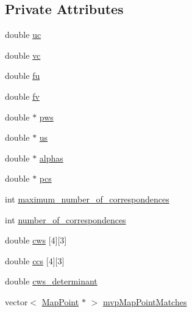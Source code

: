 \subsection*{Private Attributes}
\begin{DoxyCompactItemize}
\item 
double \mbox{\hyperlink{class_o_r_b___s_l_a_m2_1_1_pn_psolver_aed7cb3c5dcf35bb2e6074679ba2a76e3}{uc}}
\item 
double \mbox{\hyperlink{class_o_r_b___s_l_a_m2_1_1_pn_psolver_a8c88482e4f7fb0ca8519a4897c936f4f}{vc}}
\item 
double \mbox{\hyperlink{class_o_r_b___s_l_a_m2_1_1_pn_psolver_af65e2f3506f97dd52f00be073209acd1}{fu}}
\item 
double \mbox{\hyperlink{class_o_r_b___s_l_a_m2_1_1_pn_psolver_a97e47e678a18e47e29a3d9b6842222eb}{fv}}
\item 
double $\ast$ \mbox{\hyperlink{class_o_r_b___s_l_a_m2_1_1_pn_psolver_a053e3eea03b62181aa944c9fc20d5bfa}{pws}}
\item 
double $\ast$ \mbox{\hyperlink{class_o_r_b___s_l_a_m2_1_1_pn_psolver_afc95fe222dcfad864207925e2783e9ce}{us}}
\item 
double $\ast$ \mbox{\hyperlink{class_o_r_b___s_l_a_m2_1_1_pn_psolver_a868ef3e00710a5541d50a15af7be2a20}{alphas}}
\item 
double $\ast$ \mbox{\hyperlink{class_o_r_b___s_l_a_m2_1_1_pn_psolver_ac832e2ede20f3a111a29b4d1c24b0587}{pcs}}
\item 
int \mbox{\hyperlink{class_o_r_b___s_l_a_m2_1_1_pn_psolver_a7c44ad1754b7d0817470a96156d5772a}{maximum\+\_\+number\+\_\+of\+\_\+correspondences}}
\item 
int \mbox{\hyperlink{class_o_r_b___s_l_a_m2_1_1_pn_psolver_a2e762455c896cbc55bd81c77af87941f}{number\+\_\+of\+\_\+correspondences}}
\item 
double \mbox{\hyperlink{class_o_r_b___s_l_a_m2_1_1_pn_psolver_acce97bf95ac136a37e0ddbfced436d44}{cws}} \mbox{[}4\mbox{]}\mbox{[}3\mbox{]}
\item 
double \mbox{\hyperlink{class_o_r_b___s_l_a_m2_1_1_pn_psolver_ada47673e9ff64787eda1412e35056627}{ccs}} \mbox{[}4\mbox{]}\mbox{[}3\mbox{]}
\item 
double \mbox{\hyperlink{class_o_r_b___s_l_a_m2_1_1_pn_psolver_a7aa2e7f95408450609eba8509f0d5571}{cws\+\_\+determinant}}
\item 
vector$<$ \mbox{\hyperlink{class_o_r_b___s_l_a_m2_1_1_map_point}{Map\+Point}} $\ast$ $>$ \mbox{\hyperlink{class_o_r_b___s_l_a_m2_1_1_pn_psolver_a4a53aa206e4d1f799db01b5b2ef622fe}{mvp\+Map\+Point\+Matches}}

\end{DoxyCompactItemize}

